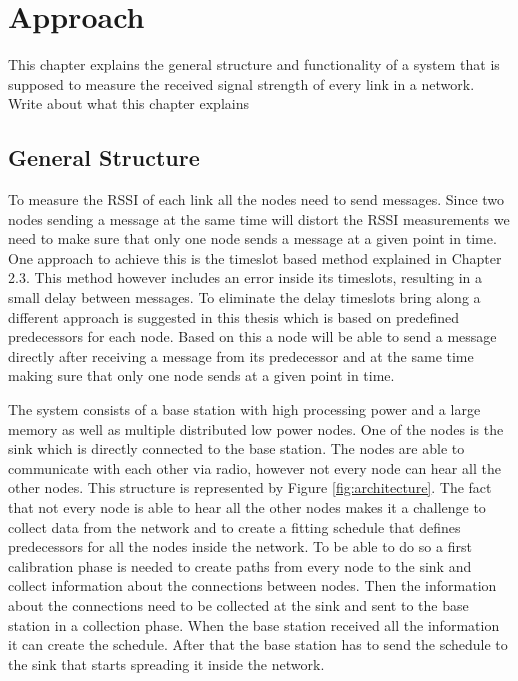 \chapter{Approach}
\label{chp:apr}
This chapter explains the general structure and functionality of a system that is supposed to measure the received signal strength of every link in a network.
\TODO Write about what this chapter explains

\section{General Structure}
\label{chp:apr_general}

To measure the RSSI of each link all the nodes need to send messages. Since two nodes sending a message at the same time will distort the RSSI measurements we need to make sure that only one node sends a message at a given point in time. One approach to achieve this is the timeslot based method explained in Chapter 2.3. This method however includes an error inside its timeslots, resulting in a small delay between messages.
To eliminate the delay timeslots bring along a different approach is suggested in this thesis which is based on predefined predecessors for each node. Based on this a node will be able to send a message directly after receiving a message from its predecessor and at the same time making sure that only one node sends at a given point in time.

The system consists of a base station with high processing power and a large memory as well as multiple distributed low power nodes. One of the nodes is the sink which is directly connected to the base station. The nodes are able to communicate with each other via radio, however not every node can hear all the other nodes. This structure is represented by Figure \ref{fig:architecture}. The fact that not every node is able to hear all the other nodes makes it a challenge to collect data from the network and to create a fitting schedule that defines predecessors for all the nodes inside the network. To be able to do so a first calibration phase is needed to create paths from every node to the sink and collect information about the connections between nodes. Then the information about the connections need to be collected at the sink and sent to the base station in a collection phase. When the base station received all the information it can create the schedule. After that the base station has to send the schedule to the sink that starts spreading it inside the network. 

